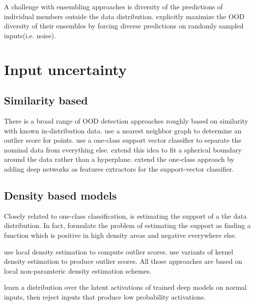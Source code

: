 \documentclass[../main.tex]{subfiles}
\begin{document}
A challenge with ensembling approaches is diversity of the predictions of individual members outside the data distribution. \citet{jain2019maximizing} explicitly maximize the OOD diversity of their ensembles by forcing diverse predictions on randomly sampled inputs(i.e. noise). 


\section{Input uncertainty}

\subsection{Similarity based}

There is a broad range of OOD detection approaches roughly based on similarity with known in-distribution data. \citep{hautamaki2004outlier, NIPS2009_3723, zhang2009new} use a nearest neighbor graph to determine an outlier score for points. 
\cite{scholkopf2000support} use a one-class support vector classifier to separate the nominal data from everything else. \citet{tax2004support} extend this idea to fit a spherical boundary around the data rather than a hyperplane. \cite{erfani2016high, ruff2018deep} extend the one-class approach by adding deep networks as features extractors for the support-vector classifier.  

\subsection{Density based models}
Closely related to one-class classification, is estimating the support of a the data distribution. In fact, \citet{platt1999estimating} formulate the problem of estimating the support as finding a function which is positive in high density areas and negative everywhere else. 

\citep{breunig2000lof, zhang2009new} use local density estimation to compute outlier scores. \citep{qin2016kelos, he2004novelty, bishop1994novelty} use variants of kernel density estimation to produce outlier scores. All those approaches are based on local non-paramteric density estimation schemes. 

\citet{lee2018simple} learn a distribution over the latent activations of trained deep models on normal inputs, then reject inputs that produce low probability activations. 
\end{document}
